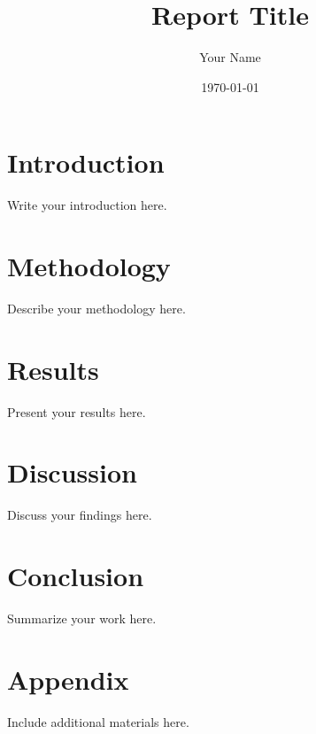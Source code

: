 \documentclass[a4paper,12pt]{article}
\title{Report Title}
\author{Your Name}
\date{\today}
\begin{document}
\maketitle
\tableofcontents
\newpage

\section{Introduction}
Write your introduction here.

\section{Methodology}
Describe your methodology here.

\section{Results}
Present your results here.

\section{Discussion}
Discuss your findings here.

\section{Conclusion}
Summarize your work here.

\appendix
\section{Appendix}
Include additional materials here.
\end{document}
